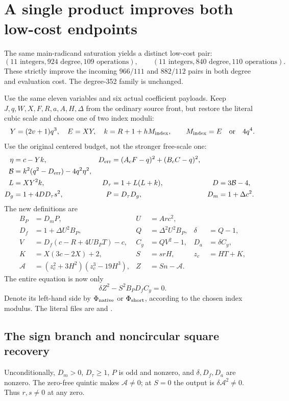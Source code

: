 \section{A single product improves both low-cost endpoints}
The same main-radicand saturation yields a distinct low-cost pair:
\[
 (11\text{ integers},924\text{ degree},109\text{ operations}),\qquad
 (11\text{ integers},840\text{ degree},110\text{ operations}).
\]
These strictly improve the incoming $966/111$ and $882/112$ pairs in
both degree and evaluation cost. The degree-352 family is unchanged.

Use the same eleven variables and six actual coefficient payloads.
Keep $J,q,W,X,F,R,a,A,H,\Delta$ from the ordinary source front, but
restore the literal cubic scale and choose one of two index moduli:
\[
 Y=(2v+1)q^3,\quad E=XY,\quad
 k=R+1+hM_{\rm index},\qquad
 M_{\rm index}=E\quad\hbox{or}\quad4q^4.
\]
Use the original centered budget, not the stronger free-scale one:
\begin{align*}
 \eta&=c-Yk,&D_{\rm err}&=(A_cF-q)^2+(B_cC-q)^2,\\
 \mathcal B&=k^2(q^2-D_{\rm err})-4q^2\eta^2,\\
 L&=XY^2k,&D_\tau&=1+L(L+k),&D&=3\mathcal B-4,\\
 D_g&=1+4DD_\tau s^2,&P&=D_\tau D_g,&D_m&=1+\Delta c^2.
\end{align*}
The new definitions are
\begin{align*}
 B_P&=D_mP,&U&=Arc^2,\\
 D_f&=1+\Delta U^2B_P,&Q&=\Delta^2U^2B_P,&\delta&=Q-1,\\
 V&=D_f(c-R+4UB_PT)-c,&C_y&=QV^2-1,&D_a&=\delta C_y,\\
 K&=X(3c-2X)+2,&S&=srH,&z_c&=HT+K,\\
 \mathcal A&=(z_c^2+3H^2)(z_c^3-19H^3),&Z&=Sn-\mathcal A.
\end{align*}
The entire equation is now only
\begin{equation}\label{eq:lowops-product}
 \boxed{\delta Z^2-S^2B_PD_fC_y=0.}
\end{equation}
Denote its left-hand side by $\Phi_{\rm native}$ or $\Phi_{\rm short}$,
according to the chosen index modulus. The literal files are
 and
.

\subsection{The sign branch and noncircular square recovery}
Unconditionally, $D_m>0$, $D_\tau\ge1$, $P$ is odd and nonzero,
and $\delta,D_f,D_a$ are nonzero. The zero-free quintic makes
$\mathcal A\ne0$; at $S=0$ the output is $\delta\mathcal A^2\ne0$.
Thus $r,s\ne0$ at any zero.

